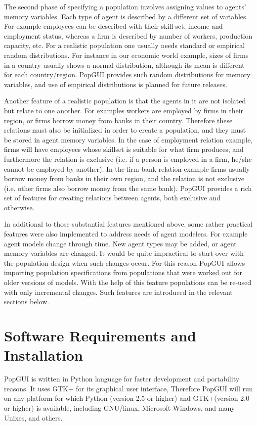 \documentclass[10pt]{article}
\begin{document}
The second phase of specifying a population involves assigning values to agents' memory variables. Each type of agent is described by a different set of variables. For example employees can be described with their skill set, income and employment status, whereas a firm is described by number of workers, production capacity, etc. For a realistic population one usually needs standard or empirical random  distributions. For instance in our economic world example, sizes of firms in a country usually shows a normal distribution, although its mean is different for each country/region. PopGUI provides such random distributions for memory variables, and use of empirical distributions is planned for future releases.

Another feature of a realistic population is that the agents in it are not isolated but relate to one another. For examples workers are employed by firms in their region, or firms borrow money from banks in their country. Therefore these relations must also be initialized in order to create a population, and they must be stored in agent memory variables. In the case of employment relation example, firms will have employees whose skillset is suitable for what firm produces, and furthermore the relation is exclusive (i.e. if a person is employed in a firm, he/she cannot be employed by another). In the firm-bank relation example firms usually borrow money from banks in their own region, and the relation is not exclusive (i.e. other firms also borrow money from the same bank). PopGUI provides a rich set of features for creating relations between agents, both exclusive and otherwise. 

In additional to those substantial features mentioned above, some rather practical features were also implemented to address needs of agent modelers. For example agent models change through time. New agent types may be added, or agent memory variables are changed. It would be quite impractical to start over with the population design when such changes occur. For this reason PopGUI allows importing population specifications from populations that were worked out for older versions of models. With the help of this feature populations can be re-used with only incremental changes. Such features are introduced in the relevant sections below.

\section{Software Requirements and Installation}
PopGUI is written in Python language for faster development and portability reasons. It uses GTK+ for its graphical user interface, Therefore PopGUI will run on any platform for which Python (version 2.5 or higher) and GTK+(version 2.0 or higher) is available, including GNU/linux, Microsoft Windows, and many Unixes, and others.
\end{document}
